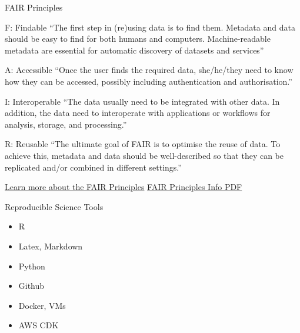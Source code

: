 \documentclass[
  ignorenonframetext,
]{beamer}
\providecommand{\tightlist}{%
  \setlength{\itemsep}{0pt}\setlength{\parskip}{0pt}}
\begin{document}
\begin{frame}{FAIR Principles}
\protect\hypertarget{fair-principles}{}
\begin{block}{F: Findable}
\protect\hypertarget{f-findable}{}
``The first step in (re)using data is to find them. Metadata and data
should be easy to find for both humans and computers. Machine-readable
metadata are essential for automatic discovery of datasets and
services''
\end{block}

\begin{block}{A: Accessible}
\protect\hypertarget{a-accessible}{}
``Once the user finds the required data, she/he/they need to know how
they can be accessed, possibly including authentication and
authorisation.''
\end{block}

\begin{block}{I: Interoperable}
\protect\hypertarget{i-interoperable}{}
``The data usually need to be integrated with other data. In addition,
the data need to interoperate with applications or workflows for
analysis, storage, and processing.''
\end{block}

\begin{block}{R: Reusable}
\protect\hypertarget{r-reusable}{}
``The ultimate goal of FAIR is to optimise the reuse of data. To achieve
this, metadata and data should be well-described so that they can be
replicated and/or combined in different settings.''

\href{https://www.go-fair.org/fair-principles/}{Learn more about the
FAIR Principles}
\href{https://www.go-fair.org/wp-content/uploads/2022/01/FAIRPrinciples_overview.pdf}{FAIR
Principles Info PDF}
\end{block}
\end{frame}

\begin{frame}{Reproducible Science Tools}
\protect\hypertarget{reproducible-science-tools}{}
\begin{itemize}
\tightlist
\item
  R
\item
  Latex, Markdown
\item
  Python
\item
  Github
\item
  Docker, VMs
\item
  AWS CDK
\end{itemize}
\end{frame}
\end{document}
